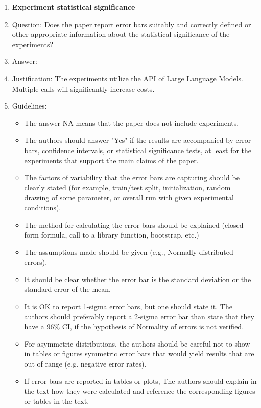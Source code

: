 \documentclass{article}
\begin{document}
\begin{enumerate}
\item {\bf Experiment statistical significance}
    \item[] Question: Does the paper report error bars suitably and correctly defined or other appropriate information about the statistical significance of the experiments?
    \item[] Answer: \answerNo{} %
    \item[] Justification: The experiments utilize the API of Large Language Models. Multiple calls will significantly increase costs.
    \item[] Guidelines:
    \begin{itemize}
        \item The answer NA means that the paper does not include experiments.
        \item The authors should answer "Yes" if the results are accompanied by error bars, confidence intervals, or statistical significance tests, at least for the experiments that support the main claims of the paper.
        \item The factors of variability that the error bars are capturing should be clearly stated (for example, train/test split, initialization, random drawing of some parameter, or overall run with given experimental conditions).
        \item The method for calculating the error bars should be explained (closed form formula, call to a library function, bootstrap, etc.)
        \item The assumptions made should be given (e.g., Normally distributed errors).
        \item It should be clear whether the error bar is the standard deviation or the standard error of the mean.
        \item It is OK to report 1-sigma error bars, but one should state it. The authors should preferably report a 2-sigma error bar than state that they have a 96\% CI, if the hypothesis of Normality of errors is not verified.
        \item For asymmetric distributions, the authors should be careful not to show in tables or figures symmetric error bars that would yield results that are out of range (e.g. negative error rates).
        \item If error bars are reported in tables or plots, The authors should explain in the text how they were calculated and reference the corresponding figures or tables in the text.
    \end{itemize}


\end{enumerate}
\end{document}
